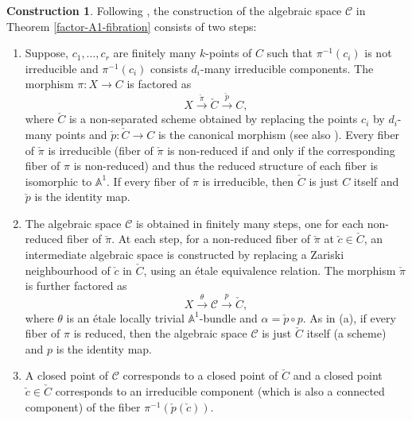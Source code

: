 \documentclass[11pt, reqno]{amsart}
\theoremstyle{plain}
\theoremstyle{definition}
\newtheorem{construction}[thm]{Construction}
\newcommand{\sC}{{\mathcal C}}
\newcommand{\A}{{\mathbb A}}
\begin{document}
    \begin{construction} \label{construction of algebraic space}
Following \cite[Theorem 9]{doub}, the construction of the algebraic space $\mathcal{C}$ in Theorem \ref{factor-A1-fibration} consists of two steps: 
\begin{enumerate}
	\item 
	Suppose, $c_1, \dots, c_r$ are finitely many $k$-points of $C$ such that $\pi^{-1}(c_i)$ is not irreducible and $\pi^{-1}(c_i)$ consists $d_i$-many irreducible components.
	The morphism $\pi: X \to C$ is factored as 
	$$X \xrightarrow{\check{\pi}} \check{C} \xrightarrow{\check{p}} C,$$
	where $\check{C}$ is a non-separated scheme obtained by replacing the points $c_i$ by $d_i$-many points and $\check{p}: \check{C} \to C$ is the canonical morphism (see also \cite[Example 7]{doub}). Every fiber of $\check{\pi}$ is irreducible 
	(fiber of $\check{\pi}$ is non-reduced if and only if the corresponding fiber of $\pi$ is non-reduced) and thus the reduced structure of each fiber is isomorphic to $\A^1$. If every fiber of $\pi$ is irreducible, then $\check{C}$ is just $C$ itself and $\check{p}$ is the identity map.
	\item The algebraic space $\sC$ is obtained in finitely many steps, one for each non-reduced fiber of $\check{\pi}$. At each step, for a non-reduced fiber of $\check{\pi}$ at $\check{c} \in \check{C}$, an intermediate algebraic space is constructed by replacing a Zariski neighbourhood of $\check{c}$ in $\check{C}$, using an \'etale equivalence relation. The morphism $\check{\pi}$ is further factored as 
	$$X \xrightarrow{\theta} \mathcal{C} \xrightarrow{p} \check{C},$$
	where $\theta$ is an \'etale locally trivial $\A^1$-bundle and $\alpha = \check{p} \circ p$. As in (a), if every fiber of $\pi$ is reduced, then the algebraic space $\sC$ is just $\check{C}$ itself (a scheme) and $p$ is the identity map. 
	\item A closed point of $\sC$ corresponds to a closed point of $\check{C}$ and a closed point $\check{c} \in \check{C}$ corresponds to an irreducible component (which is also a connected component) of the fiber $\pi^{-1}(\check{p}(\check{c}))$.
\end{enumerate}
    \end{construction}    
          
\end{document}
